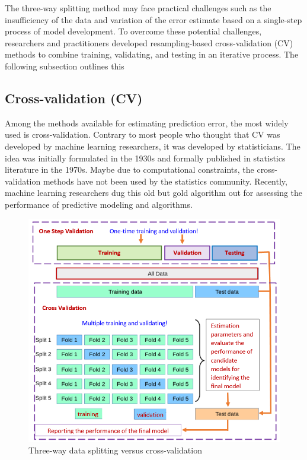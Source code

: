 \documentclass[
]{book}
\begin{document}
The three-way splitting method may face practical challenges such as the insufficiency of the data and variation of the error estimate based on a single-step process of model development. To overcome these potential challenges, researchers and practitioners developed resampling-based cross-validation (CV) methods to combine training, validating, and testing in an iterative process. The following subsection outlines this

\hypertarget{cross-validation-cv}{%
\subsection{Cross-validation (CV)}\label{cross-validation-cv}}

Among the methods available for estimating prediction error, the most widely used is cross-validation. Contrary to most people who thought that CV was developed by machine learning researchers, it was developed by statisticians. The idea was initially formulated in the 1930s and formally published in statistics literature in the 1970s. Maybe due to computational constraints, the cross-validation methods have not been used by the statistics community. Recently, machine learning researchers dug this old but gold algorithm out for assessing the performance of predictive modeling and algorithms.

\begin{figure}

{\centering \includegraphics[width=0.7\linewidth]{img08/w08-One-step-vs-CV} 

}

\caption{Three-way data splitting versus cross-validation}\label{fig:unnamed-chunk-140}
\end{figure}
\end{document}
